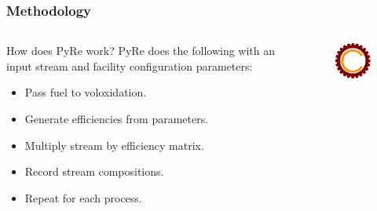 \begin{frame}
  \frametitle{Methodology}
\begin{columns}
	\begin{column}{.55\textwidth}
		\begin{block}{How does PyRe work?} 
			PyRe does the following with an input stream and facility configuration parameters: 
			\begin{itemize}
				\item Pass fuel to voloxidation.
				\item Generate efficiencies from parameters.
				\item Multiply stream by efficiency matrix.
				\item Record stream compositions.
				\item Repeat for each process.
			\end{itemize}
		\end{block}
	\end{column}
	\begin{column}{.45\textwidth}
		\begin{figure}
			\centering
			\includegraphics[width=0.9\linewidth]{cyclus}
			\label{fig:cyclus}
		\end{figure}
	\end{column}
\end{columns} 
\end{frame}

